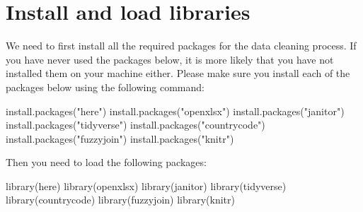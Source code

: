 \documentclass[
  12pt,
]{article}
\author{}
\date{\vspace{-2.5em}}
\newenvironment{Shaded}{}{}
\newcommand{\FunctionTok}[1]{\textcolor[rgb]{0.02,0.16,0.49}{#1}}
\newcommand{\NormalTok}[1]{#1}
\newcommand{\StringTok}[1]{\textcolor[rgb]{0.25,0.44,0.63}{#1}}
\begin{document}
\hypertarget{install-and-load-libraries}{%
\section{Install and load libraries}\label{install-and-load-libraries}}

We need to first install all the required packages for the data cleaning
process. If you have never used the packages below, it is more likely
that you have not installed them on your machine either. Please make
sure you install each of the packages below using the following command:

\begin{Shaded}
\begin{Highlighting}[]
\FunctionTok{install.packages}\NormalTok{(}\StringTok{"here"}\NormalTok{)}
\FunctionTok{install.packages}\NormalTok{(}\StringTok{"openxlsx"}\NormalTok{)}
\FunctionTok{install.packages}\NormalTok{(}\StringTok{"janitor"}\NormalTok{)}
\FunctionTok{install.packages}\NormalTok{(}\StringTok{"tidyverse"}\NormalTok{)}
\FunctionTok{install.packages}\NormalTok{(}\StringTok{"countrycode"}\NormalTok{)}
\FunctionTok{install.packages}\NormalTok{(}\StringTok{"fuzzyjoin"}\NormalTok{)}
\FunctionTok{install.packages}\NormalTok{(}\StringTok{"knitr"}\NormalTok{)}
\end{Highlighting}
\end{Shaded}

Then you need to load the following packages:

\begin{Shaded}
\begin{Highlighting}[]
\FunctionTok{library}\NormalTok{(here)}
\FunctionTok{library}\NormalTok{(openxlsx)}
\FunctionTok{library}\NormalTok{(janitor)}
\FunctionTok{library}\NormalTok{(tidyverse)}
\FunctionTok{library}\NormalTok{(countrycode)}
\FunctionTok{library}\NormalTok{(fuzzyjoin)}
\FunctionTok{library}\NormalTok{(knitr)}
\end{Highlighting}
\end{Shaded}
\end{document}
